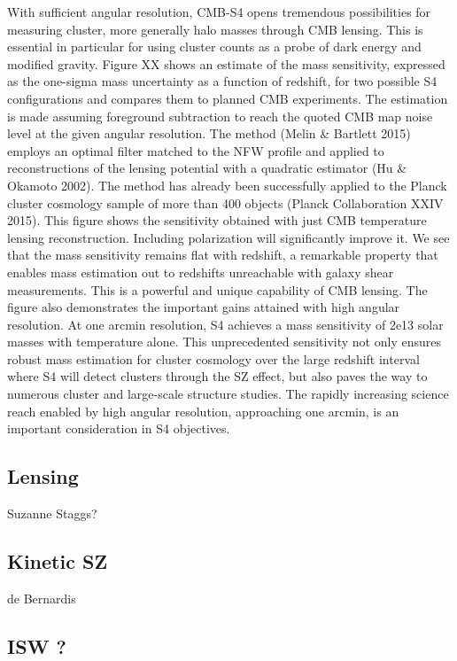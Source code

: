 \documentclass[11pt]{article}
\begin{document}
With sufficient angular resolution, CMB-S4 opens tremendous possibilities for measuring cluster, more generally halo masses through CMB lensing.  This is essential in particular for using cluster counts as a probe of dark energy and modified gravity.  Figure XX shows an estimate of the mass sensitivity, expressed as the one-sigma mass uncertainty as a function of redshift, for two possible S4 configurations and compares them to planned CMB experiments. 
	The estimation is made assuming foreground subtraction to reach the quoted CMB map noise level at the given angular resolution.  The method (Melin & Bartlett 2015) employs an optimal filter matched to the NFW profile and applied to reconstructions of the lensing potential with a quadratic estimator (Hu & Okamoto 2002).  The method has already been successfully applied to the Planck cluster cosmology sample of more than 400 objects (Planck Collaboration XXIV 2015).  This figure shows the sensitivity obtained with just CMB temperature lensing reconstruction.  Including polarization will significantly improve it.  
	We see that the mass sensitivity remains flat with redshift, a remarkable property that enables mass estimation out to redshifts unreachable with galaxy shear measurements.  This is a powerful and unique capability of CMB lensing.  The figure also demonstrates the important gains attained with high angular resolution.  At one arcmin resolution, S4 achieves a mass sensitivity of 2e13 solar masses with temperature alone.  This unprecedented sensitivity not only ensures robust mass estimation for cluster cosmology over the large redshift interval where S4 will detect clusters through the SZ effect, but also paves the way to numerous cluster and large-scale structure studies.  The rapidly increasing science reach enabled by high angular resolution, approaching one arcmin, is an important consideration in S4 objectives.  



\subsection{Lensing}

Suzanne Staggs? 

\subsection{Kinetic SZ}

de Bernardis

\subsection{ISW ?}
\end{document}
